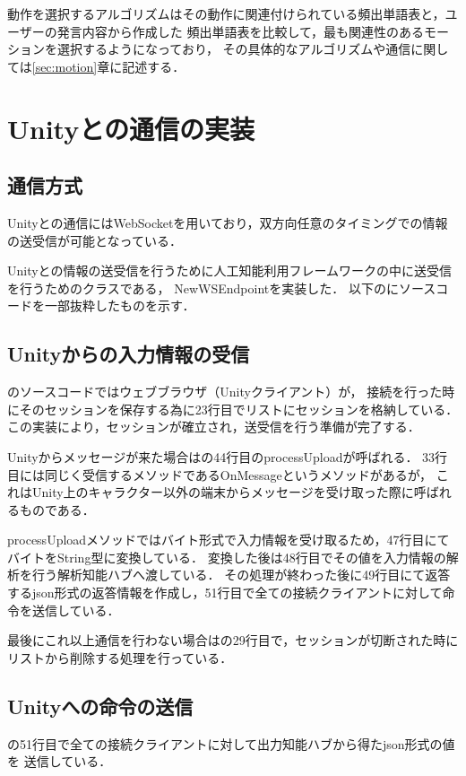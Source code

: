 動作を選択するアルゴリズムはその動作に関連付けられている頻出単語表と，ユーザーの発言内容から作成した
頻出単語表を比較して，最も関連性のあるモーションを選択するようになっており，
その具体的なアルゴリズムや通信に関しては\ref{sec:motion}章に記述する．
\section{Unityとの通信の実装}
\subsection{通信方式}
Unityとの通信にはWebSocketを用いており，双方向任意のタイミングでの情報の送受信が可能となっている．

Unityとの情報の送受信を行うために人工知能利用フレームワークの中に送受信を行うためのクラスである，
NewWSEndpointを実装した．
以下のにソースコードを一部抜粋したものを示す．


\subsection{Unityからの入力情報の受信}
のソースコードではウェブブラウザ（Unityクライアント）が，
接続を行った時にそのセッションを保存する為に23行目でリストにセッションを格納している．
この実装により，セッションが確立され，送受信を行う準備が完了する．

Unityからメッセージが来た場合はの44行目のprocessUploadが呼ばれる．
33行目には同じく受信するメソッドであるOnMessageというメソッドがあるが，
これはUnity上のキャラクター以外の端末からメッセージを受け取った際に呼ばれるものである．

processUploadメソッドではバイト形式で入力情報を受け取るため，47行目にてバイトをString型に変換している．
変換した後は48行目でその値を入力情報の解析を行う解析知能ハブへ渡している．
その処理が終わった後に49行目にて返答するjson形式の返答情報を作成し，51行目で全ての接続クライアントに対して命令を送信している．

最後にこれ以上通信を行わない場合はの29行目で，セッションが切断された時にリストから削除する処理を行っている．

\subsection{Unityへの命令の送信}
の51行目で全ての接続クライアントに対して出力知能ハブから得たjson形式の値を
送信している．

